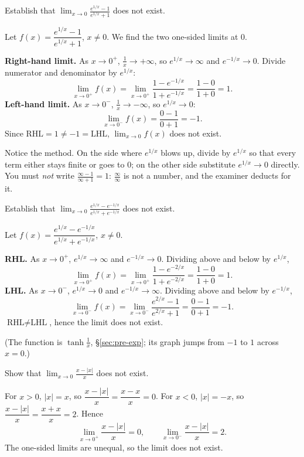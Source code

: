 \begin{example}[DU 2414 Q1(a)(i)]
Establish that $\displaystyle\lim_{x\to0}\frac{e^{1/x}-1}{e^{1/x}+1}$ does not exist.
\end{example}
\begin{solution}
Let $f(x)=\dfrac{e^{1/x}-1}{e^{1/x}+1}$, $x\ne0$. We find the two one-sided limits at $0$.

\textbf{Right-hand limit.} As $x\to0^+$, $\frac1x\to+\infty$, so $e^{1/x}\to\infty$ and $e^{-1/x}\to0$. Divide numerator and denominator by $e^{1/x}$:
\[
\lim_{x\to0^+}f(x)=\lim_{x\to0^+}\frac{1-e^{-1/x}}{1+e^{-1/x}}=\frac{1-0}{1+0}=1 .
\]
\textbf{Left-hand limit.} As $x\to0^-$, $\frac1x\to-\infty$, so $e^{1/x}\to0$:
\[
\lim_{x\to0^-}f(x)=\frac{0-1}{0+1}=-1 .
\]
Since $\text{RHL}=1\ne-1=\text{LHL}$, $\lim_{x\to0}f(x)$ does not exist.
\end{solution}
Notice the method. On the side where $e^{1/x}$ blows up, divide by $e^{1/x}$ so that every term either stays finite or goes to $0$; on the other side substitute $e^{1/x}\to0$ directly. You must \emph{not} write $\frac{\infty-1}{\infty+1}=1$: $\frac\infty\infty$ is not a number, and the examiner deducts for it.

\begin{example}[DU 1264 Q1(a)(i)]
Establish that $\displaystyle\lim_{x\to0}\frac{e^{1/x}-e^{-1/x}}{e^{1/x}+e^{-1/x}}$ does not exist.
\end{example}
\begin{solution}
Let $f(x)=\dfrac{e^{1/x}-e^{-1/x}}{e^{1/x}+e^{-1/x}}$, $x\ne0$.

\textbf{RHL.} As $x\to0^+$, $e^{1/x}\to\infty$ and $e^{-1/x}\to0$. Dividing above and below by $e^{1/x}$,
\[
\lim_{x\to0^+}f(x)=\lim_{x\to0^+}\frac{1-e^{-2/x}}{1+e^{-2/x}}=\frac{1-0}{1+0}=1 .
\]
\textbf{LHL.} As $x\to0^-$, $e^{1/x}\to0$ and $e^{-1/x}\to\infty$. Dividing above and below by $e^{-1/x}$,
\[
\lim_{x\to0^-}f(x)=\lim_{x\to0^-}\frac{e^{2/x}-1}{e^{2/x}+1}=\frac{0-1}{0+1}=-1 .
\]
$\text{RHL}\ne\text{LHL}$, hence the limit does not exist.
\end{solution}
(The function is $\tanh\frac1x$, \S\ref{sec:pre-exp}; its graph jumps from $-1$ to $1$ across $x=0$.)

\begin{example}[DU 12910 Q1(a)(i)]
Show that $\displaystyle\lim_{x\to0}\frac{x-|x|}{x}$ does not exist.
\end{example}
\begin{solution}
For $x>0$, $|x|=x$, so $\dfrac{x-|x|}{x}=\dfrac{x-x}{x}=0$. For $x<0$, $|x|=-x$, so $\dfrac{x-|x|}{x}=\dfrac{x+x}{x}=2$. Hence
\[
\lim_{x\to0^+}\frac{x-|x|}{x}=0,\qquad \lim_{x\to0^-}\frac{x-|x|}{x}=2 .
\]
The one-sided limits are unequal, so the limit does not exist.
\end{solution}

